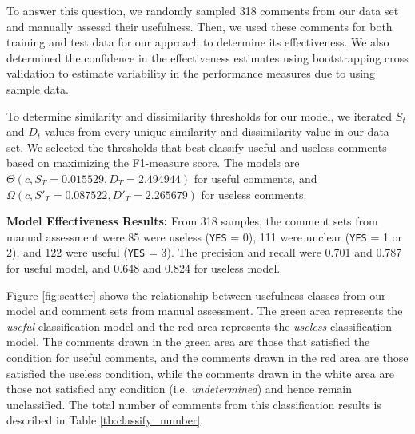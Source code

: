 To answer this question, we randomly sampled 318 comments from our data set and manually assessd their usefulness.
Then, we used these comments for both training and test data for our approach to determine its effectiveness.
We also determined the confidence in the effectiveness estimates using bootstrapping cross validation to estimate variability in the performance measures due to using sample data.


%

To determine similarity and dissimilarity thresholds for our model, we iterated $S_t$ and $D_t$ values from every unique similarity and dissimilarity value in our data set.
We selected the thresholds that best classify useful and useless comments based on maximizing the F1-measure score.
The models are $\Theta(c,S_T=0.015529,D_T=2.494944)$ for useful comments, and $\Omega(c,S'_T=0.087522,D'_T=2.265679)$ for useless comments.


\textbf{Model Effectiveness Results:} From 318 samples, the comment sets from manual assessment were 85 were useless (\texttt{YES} = 0),  111 were unclear (\texttt{YES} = 1 or 2), and 122 were useful (\texttt{YES} = 3). The precision and recall were 0.701 and 0.787 for useful model, and 0.648 and 0.824 for useless model. 

Figure \ref{fig:scatter} shows the relationship between usefulness classes from our model and comment sets from manual assessment. 
The green area represents the \emph{useful} classification model and the red area represents the \emph{useless} classification model. The comments drawn in the green area are those that satisfied the condition for useful comments, and the comments drawn in the red area are those satisfied the useless condition, while the comments drawn in the white area are those not satisfied any condition (i.e. \emph{undetermined}) and hence remain unclassified. 
The total number of comments from this classification results is described in Table \ref{tb:classify_number}. 



